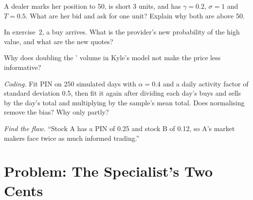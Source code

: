 \begin{exercise}[$\star\star$]\label{exo:mx:why-there-is-a-spread:4}
A dealer marks her position to 50, is short 3 units, and has $\gamma=0.2$, $\sigma=1$ and $T=0.5$. What are her bid and ask for one unit? Explain why
both are above 50.
\end{exercise}

\begin{exercise}[$\star\star$]\label{exo:mx:why-there-is-a-spread:5}
In exercise~2, a buy arrives. What is the provider's new probability of the high value, and what are the new quotes?
\end{exercise}

\begin{exercise}[$\star\star$]\label{exo:mx:why-there-is-a-spread:6}
Why does doubling the ' volume in Kyle's model not make the price less informative?
\end{exercise}

\begin{exercise}[$\star\star\star$]\label{exo:mx:why-there-is-a-spread:7}
\emph{Coding.} Fit PIN on 250 simulated days with $\alpha=0.4$ and a daily activity factor of standard deviation 0.5, then fit it again after dividing each
day's buys and sells by the day's total and multiplying by the sample's mean total. Does normalising remove the bias? Why only partly?
\end{exercise}

\begin{exercise}[$\star\star\star$]\label{exo:mx:why-there-is-a-spread:8}
\emph{Find the flaw.} ``Stock A has a PIN of 0.25 and stock B of 0.12, so A's market makers face twice as much informed trading.''
\end{exercise}

\section{Problem: The Specialist's Two Cents}

